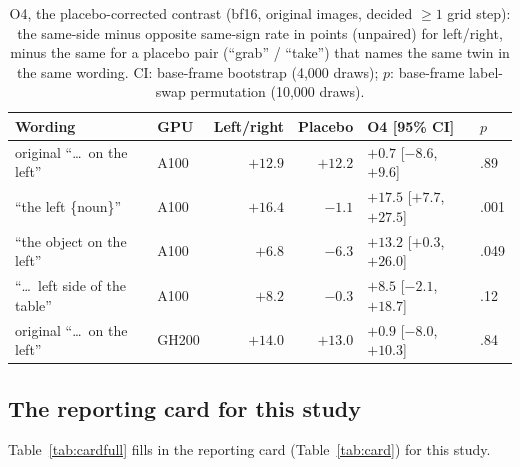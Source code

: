 \documentclass[conference]{IEEEtran}
\begin{document}
\begin{table}[t]
\centering
\scriptsize
\setlength{\tabcolsep}{2pt}
\caption{O4, the placebo-corrected contrast (bf16, original images, decided ${\geq}1$ grid step): the same-side minus opposite same-sign rate in points (unpaired) for left/right, minus the same for a placebo pair (``grab'' / ``take'') that names the same twin in the same wording. CI: base-frame bootstrap (4,000 draws); $p$: base-frame label-swap permutation (10,000 draws).}
\label{tab:o4}
\begin{tabular}{@{}l l r r l l@{}}
\toprule
Wording & GPU & Left/right & Placebo & O4 [95\% CI] & $p$\\
\midrule
original ``\dots\ on the left'' & A100 & $+12.9$ & $+12.2$ & $+0.7$ [$-8.6$, $+9.6$] & .89\\
``the left \{noun\}'' & A100 & $+16.4$ & $-1.1$ & $+17.5$ [$+7.7$, $+27.5$] & .001\\
``the object on the left'' & A100 & $+6.8$ & $-6.3$ & $+13.2$ [$+0.3$, $+26.0$] & .049\\
``\dots\ left side of the table'' & A100 & $+8.2$ & $-0.3$ & $+8.5$ [$-2.1$, $+18.7$] & .12\\
original ``\dots\ on the left'' & GH200 & $+14.0$ & $+13.0$ & $+0.9$ [$-8.0$, $+10.3$] & .84\\
\bottomrule
\end{tabular}
\end{table}

\subsection{The reporting card for this study}
\label{app:card}

Table~\ref{tab:cardfull} fills in the reporting card (Table~\ref{tab:card}) for this study.
\end{document}
